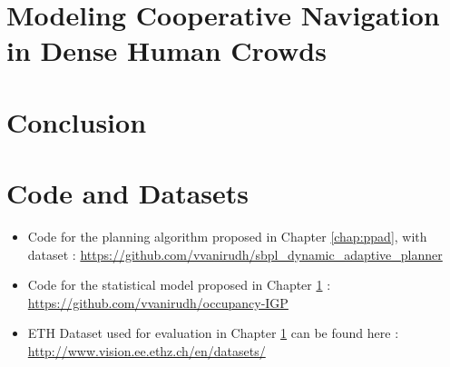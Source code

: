 \documentclass[twoside,10pt]{report}
\begin{document}
\clearpage

\chapter{Modeling Cooperative Navigation in Dense Human Crowds}
\label{chap:oigp}


\clearpage

%


\chapter{Conclusion}
\label{chap:conclusion}



\clearpage

\appendix
\chapter{Code and Datasets}
\label{chap:code-and-datasets}

\begin{itemize}
\item Code for the planning algorithm proposed in Chapter \ref{chap:ppad}, with dataset : \url{https://github.com/vvanirudh/sbpl_dynamic_adaptive_planner}
\item Code for the statistical model proposed in Chapter \ref{chap:oigp} : \url{https://github.com/vvanirudh/occupancy-IGP}
\item ETH Dataset used for evaluation in Chapter \ref{chap:oigp} can be found here : \url{http://www.vision.ee.ethz.ch/en/datasets/}
\end{itemize}


% 
{\small }
\end{document}
